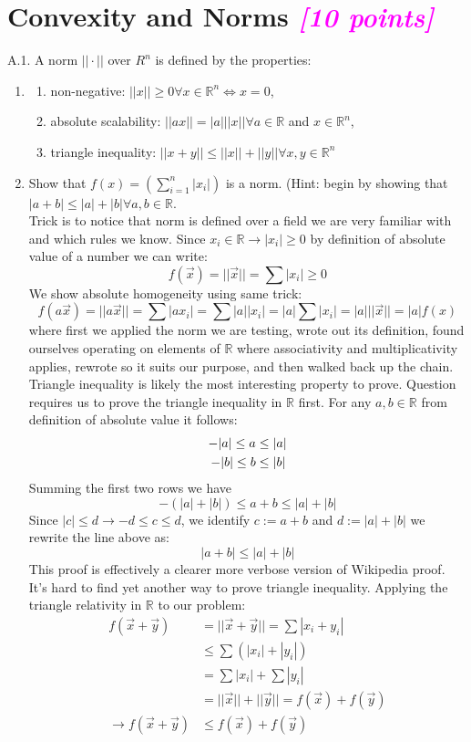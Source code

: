\documentclass{article}
\newcommand{\field}[1]{\mathbb{#1}}
\newcommand{\1}{\mathbf{1}}
\newcommand{\R}{\field{R}} %
\newcommand{\points}[1]{\small\textcolor{magenta}{\emph{[#1 points]}} \normalsize}
\begin{document}
\newpage
\section*{Convexity and Norms \points{10}}
A.1. A norm $||\cdot||$ over $R^n$ is defined by the properties:
\begin{enumerate}
\item[] \begin{enumerate}
    \item non-negative: $||x||\ge 0 \forall x \in \R^n \iff x= 0$,
    \item absolute scalability: $||ax|| = |a| ||x|| \forall a \in \R$  and $x\in\R^n$,
    \item triangle inequality: $||x+y|| \le ||x|| + ||y|| \forall x,y \in \R^n$
\end{enumerate}

\item Show that $f(x) = (\sum^n_{i=1}|x_i|)$ is a norm. (Hint: begin by showing that $|a+b| \leq |a|+|b| \forall a,b \in \R$. \\
Trick is to notice that norm is defined over a field we are very familiar with and which rules we know. Since $x_i\in\R \rightarrow |x_i|\geq 0$ by definition of absolute value of a number we can write:
$$f(\vec x) = ||\vec x|| = \sum |x_i| \geq 0$$
We show absolute homogeneity using same trick:
$$f(a\vec x)= ||a\vec x|| = \sum |ax_i| = \sum |a||x_i| = |a|\sum|x_i| = |a|||\vec x|| = |a|f(x)$$
where first we applied the norm we are testing, wrote out its definition, found ourselves operating on elements of $\R$ where associativity and multiplicativity applies, rewrote so it suits our purpose, and then walked back up the chain. Triangle inequality is likely the most interesting property to prove. Question requires us to prove the triangle inequality in $\R$ first. For any $a,b\in\R$ from definition of absolute value it follows:
\begin{align*}
\centering
    -|a|\leq a &\leq |a| \\
    -|b|\leq b &\leq |b|
\end{align*}
Summing the first two rows we have 
$$-(|a|+|b|)\leq a + b \leq |a| + |b| $$
Since $|c|\leq d \rightarrow -d \leq c \leq d$, we identify $c:=a+b$ and $d:=|a|+|b|$ we rewrite the line above as:
$$|a+b|\leq |a|+|b|$$
This proof is effectively a clearer more verbose version of Wikipedia proof. It's hard to find yet another way to prove triangle inequality. Applying the triangle relativity in $\R$ to our problem:
\begin{align*}
    f(\vec x + \vec y) &= ||\vec x + \vec y|| = \sum |x_i + y_i| \\
    & \leq \sum \left( |x_i| + |y_i|\right) \\
    &= \sum |x_i| + \sum |y_i| \\
    & = ||\vec x|| + ||\vec y|| = f(\vec x) + f(\vec y) \\
    \rightarrow f(\vec x + \vec y) &\leq f(\vec x) + f(\vec y) 
\end{align*}{}


\end{enumerate}
\end{document}
